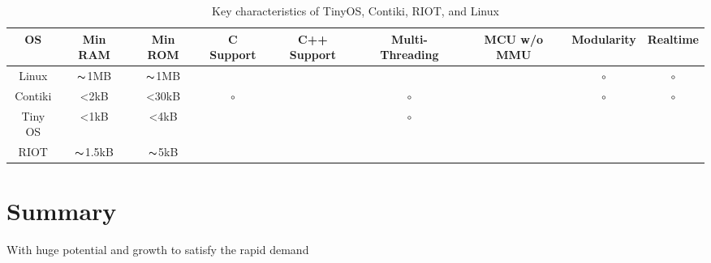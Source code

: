 \begin{sidewaystable}[h!]
	\centering
	
	\begin{tabular}{c|c|c|c|c|c|c|c|c}
	OS & Min RAM & Min ROM & C Support & C++ Support & Multi-Threading & MCU w/o MMU & Modularity & Realtime\\
	\hline
	\hline
	Linux & $\thicksim$1MB & $\thicksim$1MB  & \cmark & \cmark & \cmark & \xmark & $\circ$ & $\circ$ \\
	Contiki & <2kB & <30kB  & $\circ$ & \xmark & $\circ$ & \cmark & $\circ$ & $\circ$ \\
	Tiny OS & <1kB & <4kB  & \xmark & \xmark & $\circ$ & \cmark & \xmark & \xmark \\
	RIOT & $\thicksim$1.5kB & $\thicksim$5kB  & \cmark & \cmark & \cmark & \cmark & \cmark & \cmark \\
	\end{tabular}
	\caption{Key characteristics of TinyOS, Contiki, RIOT, and Linux}
	\label{tab:my_label}
\end{sidewaystable}




\section{Summary}

With huge potential and growth to satisfy the rapid demand
